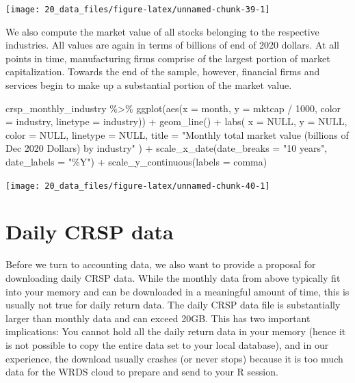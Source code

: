 \documentclass[
]{krantz}
\newenvironment{Shaded}{\begin{snugshade}}{\end{snugshade}}
\newcommand{\AttributeTok}[1]{\textcolor[rgb]{0.61,0.61,0.61}{#1}}
\newcommand{\ConstantTok}[1]{\textcolor[rgb]{0,0,0}{#1}}
\newcommand{\DecValTok}[1]{\textcolor[rgb]{0.06,0.06,0.06}{#1}}
\newcommand{\FunctionTok}[1]{\textcolor[rgb]{0,0,0}{#1}}
\newcommand{\NormalTok}[1]{#1}
\newcommand{\SpecialCharTok}[1]{\textcolor[rgb]{0,0,0}{#1}}
\newcommand{\StringTok}[1]{\textcolor[rgb]{0.5,0.5,0.5}{#1}}
\begin{document}
\begin{center}\texttt{[image: 20\_data\_files/figure-latex/unnamed-chunk-39-1]} \end{center}

We also compute the market value of all stocks belonging to the respective industries. All values are again in terms of billions of end of 2020 dollars. At all points in time, manufacturing firms comprise of the largest portion of market capitalization. Towards the end of the sample, however, financial firms and services begin to make up a substantial portion of the market value.

\begin{Shaded}
\begin{Highlighting}[]
\NormalTok{crsp\_monthly\_industry }\SpecialCharTok{\%\textgreater{}\%}
  \FunctionTok{ggplot}\NormalTok{(}\FunctionTok{aes}\NormalTok{(}\AttributeTok{x =}\NormalTok{ month, }\AttributeTok{y =}\NormalTok{ mktcap }\SpecialCharTok{/} \DecValTok{1000}\NormalTok{, }\AttributeTok{color =}\NormalTok{ industry, }\AttributeTok{linetype =}\NormalTok{ industry)) }\SpecialCharTok{+}
  \FunctionTok{geom\_line}\NormalTok{() }\SpecialCharTok{+}
  \FunctionTok{labs}\NormalTok{(}
    \AttributeTok{x =} \ConstantTok{NULL}\NormalTok{, }\AttributeTok{y =} \ConstantTok{NULL}\NormalTok{, }\AttributeTok{color =} \ConstantTok{NULL}\NormalTok{, }\AttributeTok{linetype =} \ConstantTok{NULL}\NormalTok{,}
    \AttributeTok{title =} \StringTok{"Monthly total market value (billions of Dec 2020 Dollars) by industry"}
\NormalTok{  ) }\SpecialCharTok{+}
  \FunctionTok{scale\_x\_date}\NormalTok{(}\AttributeTok{date\_breaks =} \StringTok{"10 years"}\NormalTok{, }\AttributeTok{date\_labels =} \StringTok{"\%Y"}\NormalTok{) }\SpecialCharTok{+}
  \FunctionTok{scale\_y\_continuous}\NormalTok{(}\AttributeTok{labels =}\NormalTok{ comma)}
\end{Highlighting}
\end{Shaded}

\begin{center}\texttt{[image: 20\_data\_files/figure-latex/unnamed-chunk-40-1]} \end{center}

\hypertarget{daily-crsp-data}{%
\section{Daily CRSP data}\label{daily-crsp-data}}

Before we turn to accounting data, we also want to provide a proposal for downloading daily CRSP data. While the monthly data from above typically fit into your memory and can be downloaded in a meaningful amount of time, this is usually not true for daily return data. The daily CRSP data file is substantially larger than monthly data and can exceed 20GB. This has two important implications: You cannot hold all the daily return data in your memory (hence it is not possible to copy the entire data set to your local database), and in our experience, the download usually crashes (or never stops) because it is too much data for the WRDS cloud to prepare and send to your R session.
\end{document}
